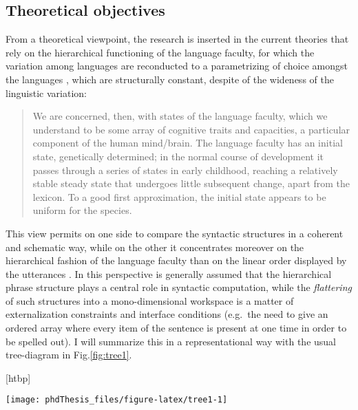 \documentclass[a4paper,twoside,12pt,chapterprefix=false,bibliography=totocnumbered,listof=flat]{scrbook}
\makeatletter
\def\fps@figure{htbp}
\renewenvironment{figure}[1][\fps@figure]{
  \edef\@tempa{\noexpand\@float{figure}[#1]} 
  \@tempa
  \sffamily
}{
  \end@float
}
\makeatother
\begin{document}
\subsection{Theoretical objectives}\label{theoretical-objectives}

From a theoretical viewpoint, the research is inserted in the current
theories that rely on the hierarchical functioning of the language
faculty, for which the variation among languages are reconducted to a
parametrizing of choice amongst the languages
\citep{adger2013, chomsky1995, chomsky1998, chomsky2013, chomsky2015, rizzi2013},
which are structurally constant, despite of the wideness of the
linguistic variation:

\begin{quote}
We are concerned, then, with states of the language faculty, which we
understand to be some array of cognitive traits and capacities, a
particular component of the human mind/brain. The language faculty has
an initial state, genetically determined; in the normal course of
development it passes through a series of states in early childhood,
reaching a relatively stable steady state that undergoes little
subsequent change, apart from the lexicon. To a good first
approximation, the initial state appears to be uniform for the species.
\citep{chomsky1995}
\end{quote}

This view permits on one side to compare the syntactic structures in a
coherent and schematic way, while on the other it concentrates moreover
on the hierarchical fashion of the language faculty than on the linear
order displayed by the utterances \citep{kayne1994, moro2000}. In this
perspective is generally assumed that the hierarchical phrase structure
plays a central role in syntactic computation, while the
\emph{flattering} of such structures into a mono-dimensional workspace
is a matter of externalization constraints and interface conditions
(e.g.~the need to give an ordered array where every item of the sentence
is present at one time in order to be spelled out). I will summarize
this in a representational way with the usual tree-diagram in
Fig.\ref{fig:tree1}.

\begin{figure}

{\centering \texttt{[image: phdThesis\_files/figure-latex/tree1-1]} 

}

\caption{Structural representation of a simple sentence}\label{fig:tree1}
\end{figure}
\end{document}
